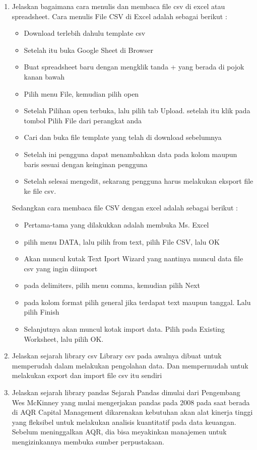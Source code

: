 \begin{enumerate}
	\item Jelaskan bagaimana cara menulis dan membaca ﬁle csv di excel atau spreadsheet.\newline
	Cara menulis File CSV di Excel adalah sebagai berikut :
	\begin{itemize}
	\item Download terlebih dahulu template csv
	\item Setelah itu buka Google Sheet di Browser
	\item Buat spreadsheet baru dengan mengklik tanda + yang berada di pojok kanan bawah
	\item Pilih menu File, kemudian pilih open
	\item Setelah Pilihan open terbuka, lalu pilih tab Upload. setelah itu klik pada tombol Pilih File dari perangkat anda
	\item Cari dan buka file template yang telah di download sebelumnya
	\item Setelah ini pengguna dapat menambahkan data pada kolom maupun baris sesuai dengan keinginan pengguna
	\item Setelah selesai mengedit, sekarang pengguna harus melakukan eksport file ke file csv.
	\end{itemize}
	
	Sedangkan cara membaca file CSV dengan excel adalah sebagai berikut :
	\begin{itemize}
	\item Pertama-tama yang dilakukkan adalah membuka Ms. Excel
	\item pilih menu DATA, lalu pilih from text, pilih File CSV, lalu OK
	\item Akan muncul kutak Text Iport Wizard yang nantinya muncul data file csv yang ingin diimport
	\item pada delimiters, pilih menu comma, kemudian pilih Next
	\item pada kolom format pilih general jika terdapat text maupun tanggal. Lalu pilih Finish
	\item Selanjutnya akan muncul kotak import data. Pilih pada Existing Worksheet, lalu pilih OK.
	\end{itemize}
	
	\item Jelaskan sejarah library csv\newline
	Library csv pada awalnya dibuat untuk memperudah dalam melakukan pengolahan data. Dan mempermudah untuk melakukan export dan import file csv itu sendiri
	
	\item Jelaskan sejarah library pandas\newline
	Sejarah Pandas dimulai dari Pengembang Wes McKinney yang mulai mengerjakan pandas pada 2008 pada saat berada di AQR Capital Management dikarenakan kebutuhan akan alat kinerja tinggi yang fleksibel untuk melakukan analisis kuantitatif pada data keuangan. Sebelum meninggalkan AQR, dia bisa meyakinkan manajemen untuk mengizinkannya membuka sumber perpustakaan.


\end{enumerate}
